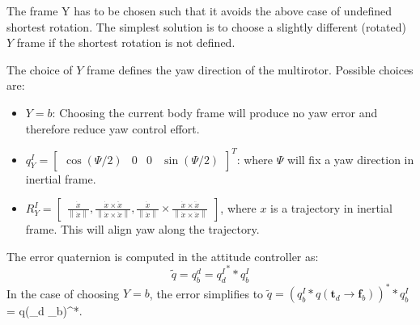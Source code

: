 \documentclass[a4paper]{paper}
\begin{document}
The frame Y has to be chosen such that it avoids the above case of undefined shortest rotation.
The simplest solution is to choose a slightly different (rotated) $Y$ frame if the shortest rotation is not defined.

The choice of $Y$ frame defines the yaw direction of the multirotor. Possible choices are:
\begin{itemize}
    \item $Y = b$: Choosing the current body frame will produce no yaw error and therefore reduce yaw control effort.
    \item $q_Y^I = \left[\begin{matrix} \cos(\Psi/2) & 0 & 0 & \sin(\Psi/2)\end{matrix}\right]^T$: where $\Psi$ will fix a yaw direction in inertial frame.
    \item $R_Y^I = \left[\begin{matrix}
    \frac{\dot{x}}{\left\lVert\dot{x}\right\rVert},
    \frac{\dot{x} \times \ddot{x}}{\left\lVert \dot{x} \times \ddot{x} \right\rVert},
    \frac{\dot{x}}{\left\lVert\dot{x}\right\rVert} \times \frac{\dot{x} \times \ddot{x}}{\left\lVert \dot{x} \times \ddot{x} \right\rVert}
     \end{matrix}\right]$, where $x$ is a trajectory in inertial frame. This will align yaw along the trajectory.
\end{itemize}


The error quaternion is computed in the attitude controller as:
\begin{equation}
    \tilde{q} = q_b^d = {q_d^I}^* * q_b^I
\end{equation}
In the case of choosing $Y = b$, the error simplifies to $\tilde{q} = (q_b^I * q(\bm{t}_d \rightarrow \bm{f}_b))^* * q_b^I$ = q(_d \rightarrow {}_b)^*.
\end{document}
